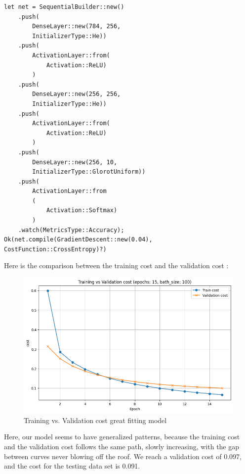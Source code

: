\documentclass[a4paper, twocolumn, twoside]{article}
\begin{document}
	\begin{verbatim}
let net = SequentialBuilder::new()
	.push(
		DenseLayer::new(784, 256,
		InitializerType::He))
	.push(
		ActivationLayer::from(
			Activation::ReLU)
		)
	.push(
		DenseLayer::new(256, 256,
		InitializerType::He))
	.push(
		ActivationLayer::from(
			Activation::ReLU)
		)
	.push(
		DenseLayer::new(256, 10,
		InitializerType::GlorotUniform))
	.push(
		ActivationLayer::from
		(
			Activation::Softmax)
		)
	.watch(MetricsType::Accuracy);
Ok(net.compile(GradientDescent::new(0.04), CostFunction::CrossEntropy)?)
	\end{verbatim}
        Here is the comparison between the training cost and the validation cost :
	\begin{figure}[H]
		\begin{center}
			\includegraphics[width=\columnwidth]{images/cost_greatfit.png}
		\end{center}
		\caption{Training vs. Validation cost great fitting model}\label{fig:cost_greatfit}
	\end{figure}
	Here, our model seems to have generalized patterns, because the training cost and 
	the validation cost follows the same path, slowly increasing, with the gap between curves never blowing off the roof.
	We reach a validation cost of 0.097, and the cost for the testing data set is 0.091.
\end{document}
